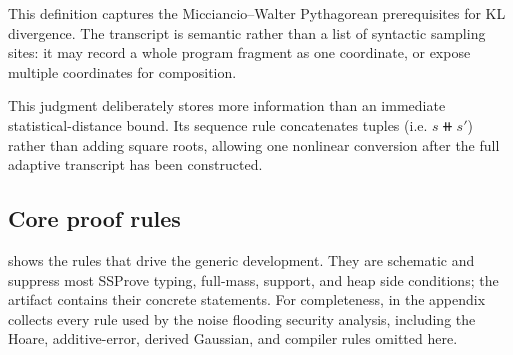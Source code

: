 This definition captures the Micciancio--Walter \cite{mw17} Pythagorean
prerequisites for KL divergence.
The transcript is semantic rather than a list of syntactic sampling sites: it may record a
whole program fragment as one coordinate, or expose multiple coordinates for
composition.

This judgment deliberately stores more information than an immediate statistical-distance bound.
Its sequence rule concatenates tuples (i.e. $s\doubleplus s'$) rather than adding square roots, allowing one nonlinear conversion after the full adaptive transcript has been constructed.

\subsection{Core proof rules}
\label{sec:logic-rules}

 shows the rules that drive the generic development.
They are schematic and suppress most SSProve typing, full-mass, support, and
heap side conditions; the artifact contains their concrete statements.
For completeness,  in the appendix collects
every rule used by the noise flooding security analysis, including the Hoare, additive-error, derived Gaussian, and
compiler rules omitted here.

